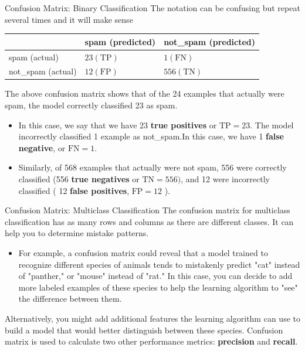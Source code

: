 \documentclass[8pt,dvipsnames]{beamer}
\begin{document}
\begin{frame}{Confusion Matrix: Binary Classification}
	The notation can be confusing but repeat several times and it will make sense
	\begin{center}
		\begin{tabular}{lll}
			\hline               & spam (predicted)  & not\_spam (predicted) \\
			\hline spam (actual) & $23(\mathrm{TP})$ & $1(\mathrm{FN})$      \\
			not\_spam (actual)   & $12(\mathrm{FP})$ & $556(\mathrm{TN})$    \\
			\hline
		\end{tabular}
	\end{center}

	The above confusion matrix shows that of the 24 examples that actually were spam, the model correctly classified 23 as spam.
	\begin{itemize}
		\item In this case, we say that we have 23 \textbf{true positives} or $\mathrm{TP}=23$. The model incorrectly classified 1 example as not\_spam.In this case, we have 1 \textbf{false negative}, or $\mathrm{FN}=1$.
		\item Similarly, of 568 examples that actually were not spam, 556 were correctly classified (556 \textbf{true negatives} or $\mathrm{TN}=556)$, and 12 were incorrectly classified ( 12 \textbf{false positives}, $\mathrm{FP}=12$ ).
	\end{itemize}
\end{frame}

\begin{frame}{Confusion Matrix: Multiclass Classification}
	The confusion matrix for multiclass classification has as many rows and columns as there are different classes. It can help you to determine mistake patterns.
	\begin{itemize}
		\item For example, a confusion matrix could reveal that a model trained to recognize different species of animals tends to mistakenly predict "cat" instead of "panther," or "mouse" instead of "rat." In this case, you can decide to add more labeled examples of these species to help the learning algorithm to "see" the difference between them.
	\end{itemize}
	Alternatively, you might add additional features the learning algorithm can use to build a model that would better distinguish between these species. Confusion matrix is used to calculate two other performance metrics: \textbf{precision} and \textbf{recall}.
\end{frame}
\end{document}
